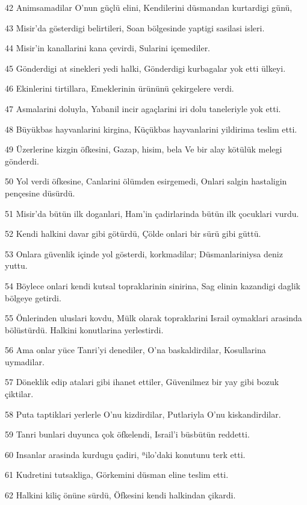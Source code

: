 \par 42 Animsamadilar O'nun güçlü elini, Kendilerini düsmandan kurtardigi günü,
\par 43 Misir'da gösterdigi belirtileri, Soan bölgesinde yaptigi sasilasi isleri.
\par 44 Misir'in kanallarini kana çevirdi, Sularini içemediler.
\par 45 Gönderdigi at sinekleri yedi halki, Gönderdigi kurbagalar yok etti ülkeyi.
\par 46 Ekinlerini tirtillara, Emeklerinin ürününü çekirgelere verdi.
\par 47 Asmalarini doluyla, Yabanil incir agaçlarini iri dolu taneleriyle yok etti.
\par 48 Büyükbas hayvanlarini kirgina, Küçükbas hayvanlarini yildirima teslim etti.
\par 49 Üzerlerine kizgin öfkesini, Gazap, hisim, bela Ve bir alay kötülük melegi gönderdi.
\par 50 Yol verdi öfkesine, Canlarini ölümden esirgemedi, Onlari salgin hastaligin pençesine düsürdü.
\par 51 Misir'da bütün ilk doganlari, Ham'in çadirlarinda bütün ilk çocuklari vurdu.
\par 52 Kendi halkini davar gibi götürdü, Çölde onlari bir sürü gibi güttü.
\par 53 Onlara güvenlik içinde yol gösterdi, korkmadilar; Düsmanlariniysa deniz yuttu.
\par 54 Böylece onlari kendi kutsal topraklarinin sinirina, Sag elinin kazandigi daglik bölgeye getirdi.
\par 55 Önlerinden uluslari kovdu, Mülk olarak topraklarini Israil oymaklari arasinda bölüstürdü. Halkini konutlarina yerlestirdi.
\par 56 Ama onlar yüce Tanri'yi denediler, O'na baskaldirdilar, Kosullarina uymadilar.
\par 57 Döneklik edip atalari gibi ihanet ettiler, Güvenilmez bir yay gibi bozuk çiktilar.
\par 58 Puta taptiklari yerlerle O'nu kizdirdilar, Putlariyla O'nu kiskandirdilar.
\par 59 Tanri bunlari duyunca çok öfkelendi, Israil'i büsbütün reddetti.
\par 60 Insanlar arasinda kurdugu çadiri, ªilo'daki konutunu terk etti.
\par 61 Kudretini tutsakliga, Görkemini düsman eline teslim etti.
\par 62 Halkini kiliç önüne sürdü, Öfkesini kendi halkindan çikardi.
